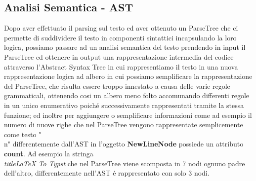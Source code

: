 ﻿\documentclass{article}
\begin{document}
    \subsection{Analisi Semantica - AST}
    Dopo aver effettuato il parsing sul testo ed aver ottenuto un ParseTree che ci permette di suddividere il testo in componenti sintattici incapsulando la loro logica, possiamo passare ad un analisi semantica del testo prendendo in input il ParseTree ed ottenere in output una rappresentazione intermedia del codice attraverso l'Abstract Syntax Tree in cui rappresentiamo il testo in una nuova rappresentazione logica ad albero in cui possiamo semplificare la rappresentazione del ParseTree, che risulta essere troppo innestato a causa delle varie regole grammaticali, ottenendo cosi un albero meno folto accomunando differenti regole in un unico enumerativo poiché successivamente rappresentati tramite la stessa funzione; ed inoltre per aggiungere o semplificare informazioni come ad esempio il numero di nuove righe che nel ParseTree vengono rappresentate semplicemente come testo "\\n" differentemente dall'AST in l'oggetto \textbf{NewLineNode} possiede un attributo \textbf{count}. Ad esempio la stringa \textit{\\title{LaTeX To Typst}} che nel ParseTree viene scomposta in 7 nodi ognuno padre dell'altro, differentemente nell'AST é rappresentato con solo 3 nodi.
\end{document}
